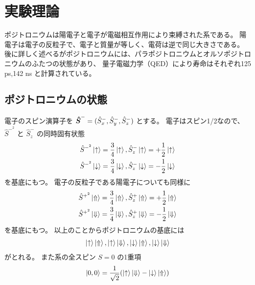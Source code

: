 \chapter{実験理論}\label{theory}



ポジトロニウムは陽電子と電子が電磁相互作用により束縛された系である。
陽電子は電子の反粒子で、電子と質量が等しく、電荷は逆で同じ大きさである。
後に詳しく述べるがポジトロニウムには、パラポジトロニウムとオルソポジトロニウムのふたつの状態があり、
量子電磁力学（QED）により寿命はそれぞれ125 ps,142 ns と計算されている。


\section{ポジトロニウムの状態}

電子のスピン演算子を
$\mbox{\boldmath $\hat{S}$}^{-} = (\hat{S}^{-}_{x},\hat{S}^{-}_{y},\hat{S}^{-}_{z})$
とする。
電子はスピン1/2なので、
$\hat{S}^{-^{2}}$
と
$\hat{S}^{-}_{z}$
の同時固有状態
\begin{equation}
\begin{split}
\hat{S}^{-^{2}} \ket{ \uparrow } = \frac{3}{4} \ket{ \uparrow },
\hat{S}^{-}_{z} \ket{ \uparrow } = + \frac{1}{2} \ket{ \uparrow } \\
\hat{S}^{-^{2}} \ket{ \downarrow } = \frac{3}{4} \ket{ \downarrow },
\hat{S}^{-}_{z} \ket{ \downarrow } = - \frac{1}{2} \ket{ \downarrow }
\end{split}
\label{eq:groundele}
\end{equation}
を基底にもつ。
電子の反粒子である陽電子についても同様に
\begin{equation}
\begin{split}
\hat{S}^{+^{2}} \ket{ \Uparrow } = \frac{3}{4} \ket{ \Uparrow },
\hat{S}^{+}_{z} \ket{ \Uparrow } = + \frac{1}{2} \ket{ \Uparrow } \\
\hat{S}^{+^{2}} \ket{ \Downarrow } = \frac{3}{4} \ket{ \Downarrow },
\hat{S}^{+}_{z} \ket{ \Downarrow } = - \frac{1}{2} \ket{ \Downarrow }
\end{split}
\label{eq:groundeposi}
\end{equation}
を基底にもつ。
以上のことからポジトロニウムの基底には
\begin{equation}
\ket{ \uparrow } \ket{ \Uparrow },\ket{ \uparrow } \ket{ \Downarrow },
\ket{ \downarrow } \ket{ \Uparrow },\ket{ \downarrow } \ket{ \Downarrow }
\end{equation}
がとれる。
また系の全スピン $S = 0$ の1重項
\begin{equation}
\ket{0,0} = \frac{1}{\sqrt{2}} ( \ket{ \uparrow } \ket{ \Downarrow } - \ket{ \downarrow } \ket{ \Uparrow })
\label{eq:para}
\end{equation}
